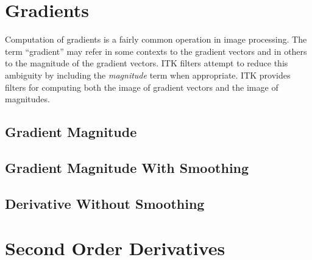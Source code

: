 \ifitkFullVersion

\fi

\section{Gradients}
\label{sec:GradientFiltering}

Computation of gradients is a fairly common operation in image processing. The
term ``gradient'' may refer in some contexts to the gradient vectors and in
others to the magnitude of the gradient vectors. ITK filters attempt to
reduce this ambiguity by including the \emph{magnitude} term when
appropriate. ITK provides filters for computing both the image of gradient
vectors and the image of magnitudes.

\subsection{Gradient Magnitude}
\label{sec:GradientMagnitudeImageFilter}

\ifitkFullVersion

\fi

\subsection{Gradient Magnitude With Smoothing}
\label{sec:GradientMagnitudeRecursiveGaussianImageFilter}

\ifitkFullVersion

\fi


\subsection{Derivative Without Smoothing}
\label{sec:DerivativeImageFilter}

\ifitkFullVersion

\fi


\section{Second Order Derivatives}
\label{sec:SecondOrderDerivatives}





